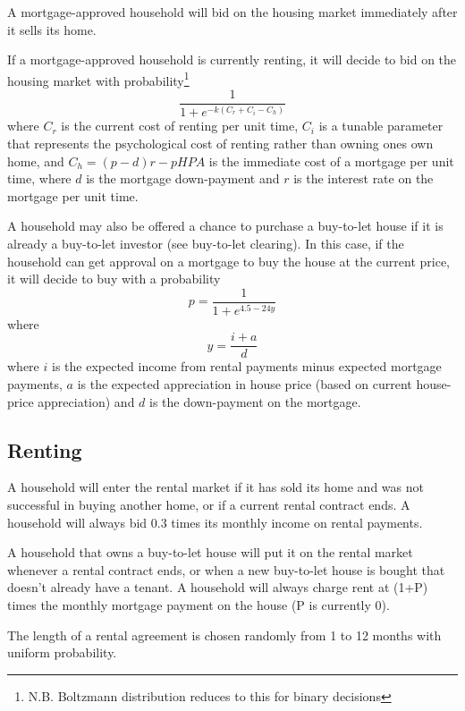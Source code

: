 \documentclass[a4paper]{article}
\begin{document}
A mortgage-approved household will bid on the housing market immediately after it sells its home.

If a mortgage-approved household is currently renting, it will decide to bid on the housing market with probability\footnote{N.B. Boltzmann distribution reduces to this for binary decisions}
\begin{equation}
\frac{1}{1+e^{-k(C_r + C_i - C_h)}}
\end{equation}
 where $C_r$ is the current cost of renting per unit time, $C_i$ is a tunable parameter that represents the psychological cost of renting rather than owning ones own home, and $C_h = (p-d)r - pHPA$ is the immediate cost of a mortgage per unit time, where $d$ is the mortgage down-payment and $r$ is the interest rate on the mortgage per unit time.

A household may also be offered a chance to purchase a buy-to-let house if it is already a buy-to-let investor (see buy-to-let clearing). In this case, if the household can get approval on a mortgage to buy the house at the current price, it will decide to buy with a probability
\begin{equation}
p = \frac{1}{1 + e^{4.5 - 24y}}
\end{equation}
where
\begin{equation}
y = \frac{i + a}{d}
\end{equation}
where $i$ is the expected income from rental payments minus expected mortgage payments, $a$ is the expected appreciation in house price (based on current house-price appreciation) and $d$ is the down-payment on the mortgage.

\subsection{Renting}

A household will enter the rental market if it has sold its home and was not successful in buying another home, or if a current rental contract ends. A household will always bid 0.3 times its monthly income on rental payments.

A household that owns a buy-to-let house will put it on the rental market whenever a rental contract ends, or when a new buy-to-let house is bought that doesn't already have a tenant. A household will always charge rent at (1+P) times the monthly mortgage payment on the house (P is currently 0).

The length of a rental agreement is chosen randomly from 1 to 12 months with uniform probability.
\end{document}
